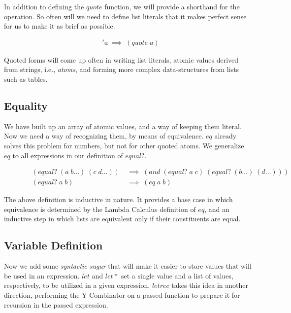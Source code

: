 In addition to defining the $quote$ function, we will provide a shorthand for the 
operation. So often will we need to define list literals that it makes perfect 
sense for us to make it as brief as possible.

\begin{figure}[htp]
\caption{}\label{scheme}
\begin{align*}
& 'a \; \implies \; (quote \; a)
\end{align*}
\end{figure}

Quoted forms will come up often in writing list literals, atomic values derived 
from strings, i.e., \emph{atoms}, and forming more complex data-structures from lists 
such as tables.

\subsection{Equality}
We have built up an array of atomic values, and a way of keeping them literal. Now 
we need a way of recognizing them, by means of equivalence. $eq$ already solves 
this problem for numbers, but not for other quoted atoms. We generalize $eq$ to 
all expressions in our definition of $equal?$.

\begin{figure}[htp]
\caption{}\label{scheme}
\begin{align*}
& (equal? \; (a \; b\dots) \; (c \; d\dots)) \; &\implies \; (and \; (equal? \; a \; c) \; (equal? \; (b\dots) \; (d\dots)))
\\& (equal? \; a \; b) \; &\implies \; (eq \; a \; b)
\end{align*}
\end{figure}

The above definition is inductive in nature. It provides a base case in which 
equivalence is determined by the Lambda Calculus definition of $eq$, and an 
inductive step in which lists are equivalent only if their constituents are equal.

\subsection{Variable Definition}
Now we add some \emph{syntactic sugar} that will make it easier to store values that 
will be used in an expression. $let$ and $let*$ set a single value and a list of 
values, respectively, to be utilized in a given expression. $letrec$ takes this 
idea in another direction, performing the Y-Combinator on a passed function to 
prepare it for recursion in the passed expression.


